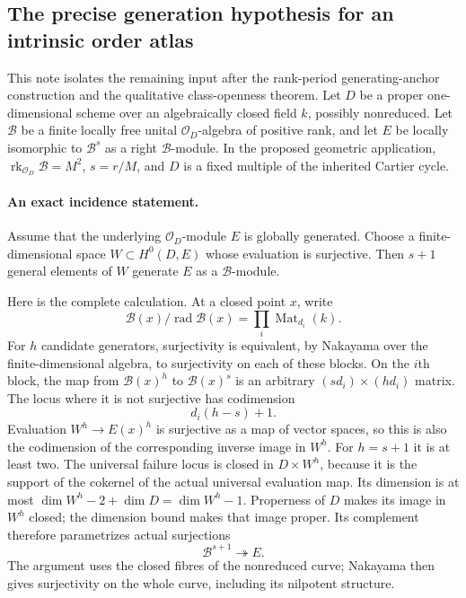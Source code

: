 \subsection*{The precise generation hypothesis for an intrinsic order atlas}

This note isolates the remaining input after the rank-period generating-anchor
construction and the qualitative class-openness theorem.  Let $D$ be a proper
one-dimensional scheme over an algebraically closed field $k$, possibly
nonreduced.  Let $\mathcal B$ be a finite locally free unital
$\mathcal O_D$-algebra of positive rank, and let $E$ be locally isomorphic to
$\mathcal B^s$ as a right $\mathcal B$-module.  In the proposed geometric
application, $\operatorname{rk}_{\mathcal O_D}\mathcal B=M^2$,
$s=r/M$, and $D$ is a fixed multiple of the inherited Cartier cycle.

\paragraph{An exact incidence statement.}
Assume that the underlying $\mathcal O_D$-module $E$ is globally generated.
Choose a finite-dimensional space $W\subset H^0(D,E)$ whose evaluation is
surjective.  Then $s+1$ general elements of $W$ generate $E$ as a
$\mathcal B$-module.

Here is the complete calculation.  At a closed point $x$, write
\[
 \mathcal B(x)/\operatorname{rad}\mathcal B(x)
       =\prod_i\operatorname{Mat}_{d_i}(k).
\]
For $h$ candidate generators, surjectivity is equivalent, by Nakayama over
the finite-dimensional algebra, to surjectivity on each of these blocks.
On the $i$th block, the map from $\mathcal B(x)^h$ to
$\mathcal B(x)^s$ is an arbitrary $(s d_i)\times(h d_i)$ matrix.
The locus where it is not surjective has codimension
\[
                         d_i(h-s)+1.
\]
Evaluation $W^h\to E(x)^h$ is surjective as a map of vector spaces, so this
is also the codimension of the corresponding inverse image in $W^h$.
For $h=s+1$ it is at least two.  The universal failure locus is closed in
$D\times W^h$, because it is the support of the cokernel of the actual
universal evaluation map.  Its dimension is at most
$\dim W^h-2+\dim D=\dim W^h-1$.  Properness of $D$ makes its image in
$W^h$ closed; the dimension bound makes that image proper.  Its complement
therefore parametrizes actual surjections
\[
                 \mathcal B^{s+1}\twoheadrightarrow E.
\]
The argument uses the closed fibres of the nonreduced curve; Nakayama then
gives surjectivity on the whole curve, including its nilpotent structure.

